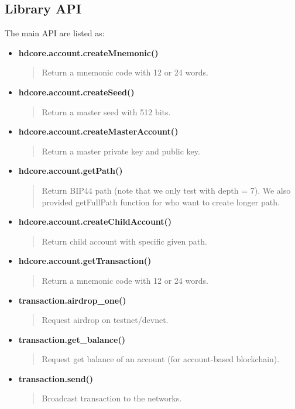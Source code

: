 \subsection{Library API}
\label{typeapi}
The main API are listed as:
\begin{itemize}
    \item \textbf{hdcore.account.createMnemonic()}
          \begin{quote}
              Return a mnemonic code with 12 or 24 words.
          \end{quote}

    \item \textbf{hdcore.account.createSeed()}
          \begin{quote}
              Return a master seed with 512 bits.
          \end{quote}

    \item \textbf{hdcore.account.createMasterAccount()}
          \begin{quote}
              Return a master private key and public key.
          \end{quote}

    \item \textbf{hdcore.account.getPath()}
          \begin{quote}
              Return BIP44 path (note that we only test with depth = 7). We also provided getFullPath function for who want to create longer path.
          \end{quote}

    \item \textbf{hdcore.account.createChildAccount()}
          \begin{quote}
              Return child account with specific given path.
          \end{quote}

    \item \textbf{hdcore.account.getTransaction()}
          \begin{quote}
              Return a mnemonic code with 12 or 24 words.
          \end{quote}

    \item \textbf{transaction.airdrop\_one()}
          \begin{quote}
              Request airdrop on testnet/devnet.
          \end{quote}

    \item \textbf{transaction.get\_balance()}
          \begin{quote}
              Request get balance of an account (for account-based blockchain).
          \end{quote}

    \item \textbf{transaction.send()}
          \begin{quote}
              Broadcast transaction to the networks.
          \end{quote}
\end{itemize}

